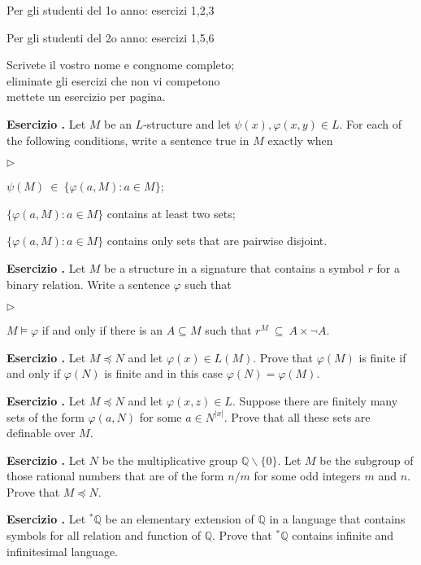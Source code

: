\documentclass[10pt]{article}
\def\phi{\varphi}
\def\sm{\smallsetminus}
\def\QQ{\mathds Q}
\newcommand{\labella}[1]{{\sf\footnotesize #1}\hfill}
\renewenvironment{itemize}
  {\begin{list}{$\triangleright$}{%
   \setlength{\parskip}{0mm}
   \setlength{\topsep}{0mm}
   \setlength{\rightmargin}{0mm}
   \setlength{\listparindent}{0mm}
   \setlength{\itemindent}{0mm}
   \setlength{\labelwidth}{3ex}
   \setlength{\itemsep}{0mm}
   \setlength{\parsep}{0mm}
   \setlength{\partopsep}{0mm}
   \setlength{\labelsep}{1ex}
   \setlength{\leftmargin}{\labelwidth+\labelsep}
   \let\makelabel\labella}}{%
   \end{list}}
\newcounter{ex}
\newenvironment{exercise}{\addtocounter{ex}{1}\textbf{Esercizio \theex.\quad}}{}
\begin{document}
Per gli studenti del 1o anno: esercizi 1,2,3\bigskip

Per gli studenti del 2o anno: esercizi 1,5,6\bigskip

Scrivete il vostro nome e congnome completo;\\
eliminate gli esercizi che non vi competono\\
mettete un esercizio per pagina.
\clearpage


\begin{exercise}
  Let $M$ be an $L$-structure and let $\psi(x), \phi(x,y)\in L$. For each of the following conditions, write a sentence true in $M$ exactly when
  \begin{itemize}
  \item[a.] $\psi(M)\ \in\ \big\{\phi(a,M): a\in M\big\}$;
  \item[b.] $\big\{\phi(a,M): a\in M\big\}$ contains at least two sets;
  \item[c.] $\big\{\phi(a,M): a\in M\big\}$ contains only sets that are pairwise disjoint.
  \end{itemize}
\end{exercise}
  
\begin{exercise}
  Let $M$ be a structure in a signature that contains a symbol $r$ for a binary relation.
  Write a sentence $\phi$ such that 
  \begin{itemize} 
  \item[a.] $M\models\phi$ if and only if there is an $A\subseteq M$ such that $r^M\ \subseteq\ A\times\neg A$.
  \end{itemize}
\end{exercise}
  

\begin{exercise}
  Let $M\preceq N$ and let $\phi(x)\in L(M)$.
  Prove that $\phi(M)$ is finite if and only if $\phi(N)$ is finite and in this case $\phi(N)=\phi(M)$.
\end{exercise}
  
\begin{exercise}
  Let $M\preceq N$ and let $\phi(x,z)\in L$.
  Suppose there are finitely many sets of the form $\phi(a,N)$ for some $a\in N^{|x|}$.
  Prove that all these sets are definable over $M$.
\end{exercise}
  
\begin{exercise}
Let $N$ be the multiplicative group $\QQ\sm\{0\}$.
Let $M$ be the subgroup of those rational numbers that are of the form $n/m$ for some odd integers $m$ and $n$.
Prove that $M\preceq N$.
\end{exercise}


\begin{exercise}
Let ${}^*\QQ$ be an elementary extension of $\QQ$ in a language that contains symbols for all relation and function of $\QQ$.
Prove that ${}^*\QQ$ contains infinite and infinitesimal language.
\end{exercise}
\end{document}
